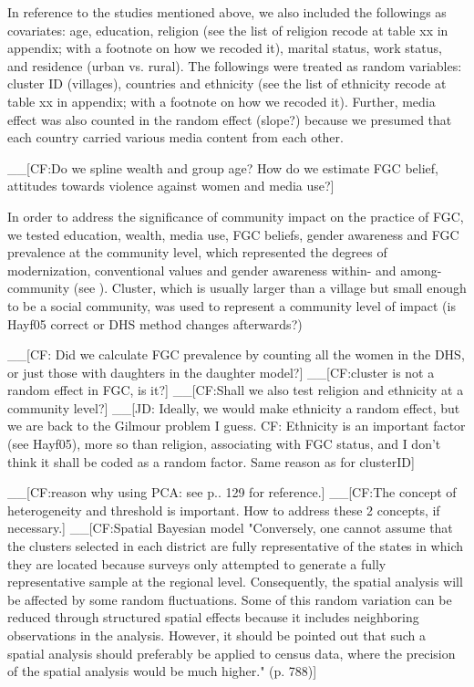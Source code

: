 \documentclass[12pt,]{article}
\begin{document}
In reference to the studies mentioned above, we also included the followings as covariates:  age, education, religion (see the list of religion recode at table xx in appendix; with a footnote on how we recoded it), marital status, work status, and residence (urban vs. rural).  The followings were treated as random variables:  cluster ID (villages), countries and ethnicity (see the list of ethnicity recode at table xx in appendix; with a footnote on how we recoded it).  Further, media effect was also counted in the random effect (slope?) because we presumed that each country carried various media content from each other.

 \_\_{[}CF:Do we spline wealth and group age? How do we estimate FGC belief, attitudes towards violence against women and media use?{]}


In order to address the significance of community impact on the practice of FGC, we tested education, wealth, media use, FGC beliefs, gender awareness and FGC prevalence at the community level, which represented the degrees of modernization, conventional values and gender awareness within- and among-community (see \cite{Achi14, BoylMcMo02, Hayf05, KandNwak09, ModrLiu13, OdukAfol17}).  Cluster, which is usually larger than a village but small enough to be a social community, was used to represent a community level of impact \cite{Hayf05} (is Hayf05 correct or DHS method changes afterwards?)

\_\_{[}CF: Did we calculate FGC prevalence by counting all the women in the DHS, or just those with daughters in the daughter model?{]}
\_\_{[}CF:cluster is not a random effect in FGC, is it?{]}
\_\_{[}CF:Shall we also test religion and ethnicity at a community level?{]}
\_\_{[}JD: Ideally, we would make ethnicity a random effect, but we are back to the Gilmour problem I guess. CF: Ethnicity is an important factor (see Hayf05), more so than religion, associating with FGC status, and I don't think it shall be coded as a random factor.  Same reason as for clusterID{]}

\_\_{[}CF:reason why using PCA:  see \cite{Hayf05} p.. 129 for reference.{]}
\_\_{[}CF:The concept of heterogeneity and threshold is important.  How to address these 2 concepts, if necessary.{]}
\_\_{[}CF:Spatial Bayesian model \cite{KandNwak09} "Conversely, one cannot assume that the clusters selected in each district are fully representative of the states in which they are located because surveys only attempted to generate a fully representative sample at the regional level. Consequently, the spatial analysis will be affected by some random fluctuations.  Some of this random variation can be reduced through structured spatial effects because it includes neighboring observations in the analysis. However, it should be pointed out that such a spatial analysis should preferably be applied to census data, where the precision of the spatial analysis would be much higher." (p. 788){]}
\end{document}
